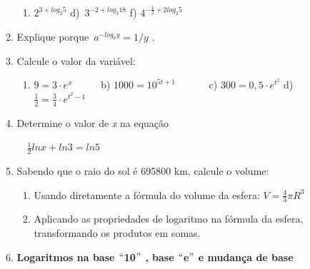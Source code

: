 \documentclass[12pt]{article}
\begin{document}
\begin{enumerate}[label*={\fontsize{14pt}{14pt}\selectfont \textbf{\arabic*.}}]
\begin{enumerate}
\begin{enumerate}
	\item  \( 2^{3+log_{2}5} \) \tab \tab d)\   \( 3^{-2+log_{3}18} \) \tab \tab f)  \( 4^{-\frac{1}{2}+2log_{2}5} \) 
\end{enumerate}\par


\vspace{\baselineskip}
	\item Explique porque\   \( a^{-log_{a}y}=1/y \) .\par


\vspace{\baselineskip}
	\item Calcule o valor da variável:\par


\vspace{\baselineskip}
\begin{enumerate}
	\item  \( 9=3 \cdot e^{x} \) \tab \ \ \ \ \  b)  \( 1000=10^{5t+1} \) \ \ \ \ \ \  c)  \( 300=0,5 \cdot e^{t^{2}} \) \tab d) \( \frac{1}{2}=\frac{3}{4} \cdot e^{t^{2}-1} \) 
\end{enumerate}\par


\vspace{\baselineskip}
	\item Determine o valor de \textit{x} na equação\par

\ \  \tab  \( \frac{1}{2}ln x+ln3=ln5 \) \par


\vspace{\baselineskip}
	\item Sabendo que o raio do sol é 695800 km, calcule o volume:\par

\begin{enumerate}
	\item Usando diretamente a fórmula do volume da esfera:  \( V=\frac{4}{3} \pi R^{3} \)  \par

	\item Aplicando as propriedades de logaritmo na fórmula da esfera, transformando os produtos em somas.
\end{enumerate}\par


\vspace{\baselineskip}
	\item {\fontsize{14pt}{16.8pt}\selectfont \textbf{Logaritmos na base $``$10$"$  , base $``$e$"$  e mudança de base}\par}\par



\end{enumerate}
\end{enumerate}
\end{document}
